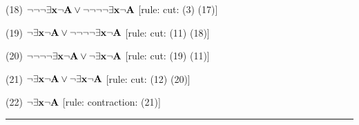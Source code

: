 \item{(18)} $\neg \neg \neg \exists {\bf x} \neg {\bf A} \lor \neg \neg \neg \neg \exists {\bf x} \neg {\bf A}$ \hfill [rule: cut: (3) (17)]
\item{(19)} $\neg \exists {\bf x} \neg {\bf A} \lor \neg \neg \neg \neg \exists {\bf x} \neg {\bf A}$ \hfill [rule: cut: (11) (18)]
\item{(20)} $\neg \neg \neg \neg \exists {\bf x} \neg {\bf A} \lor \neg \exists {\bf x} \neg {\bf A}$ \hfill [rule: cut: (19) (11)]
\item{(21)} $\neg \exists {\bf x} \neg {\bf A} \lor \neg \exists {\bf x} \neg {\bf A}$ \hfill [rule: cut: (12) (20)]
\item{(22)} $\neg \exists {\bf x} \neg {\bf A}$ \hfill [rule: contraction: (21)]
\medskip
\hrule
\medskip

\vfill
\break


